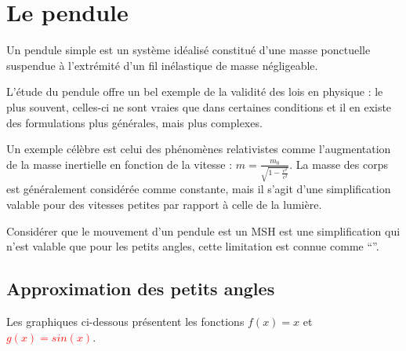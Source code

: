 \chapter{Le pendule}
Un pendule simple est un système idéalisé constitué d'une masse ponctuelle suspendue à l'extrémité d'un fil inélastique de masse négligeable.

L'étude du pendule offre un bel exemple de la validité des lois en physique : le plus souvent, celles-ci ne sont vraies que dans certaines conditions et il en existe des formulations plus générales, mais plus complexes.

Un exemple célèbre est celui des phénomènes relativistes comme l'augmentation de la masse inertielle en fonction de la vitesse : \(m=\frac{m_0}{\sqrt{1-\frac{v^2}{c^2}}}\). La masse des corps est généralement considérée comme constante, mais il s'agit d'une simplification valable pour des vitesses petites par rapport à celle de la lumière.

Considérer que le mouvement d'un pendule est un MSH est une simplification qui n'est valable que pour les petits angles, cette limitation est connue comme \enquote{}.

\newpage

\section{Approximation des petits angles}
Les graphiques ci-dessous présentent les fonctions \textcolor{OliveGreen}{\(f(x)=x\)} et \textcolor{red}{\(g(x)=sin(x)\)}.

